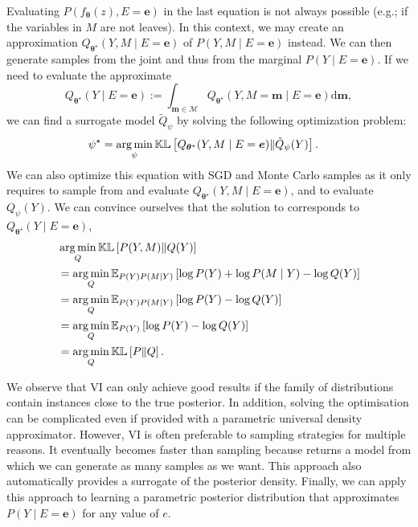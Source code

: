 Evaluating $P(f_{\bm{\theta}}(z), E=\bm{e})$ in the last equation is not always possible (e.g.; if the variables in $M$ are not leaves). In this context, we may create an approximation $Q_{\bm{\theta}^\star}(Y, M\mid E=\bm{e})$ of $P(Y, M\mid E=\bm{e})$ instead. We can then generate samples from the joint and thus from the marginal $P(Y\mid E=\bm{e})$. If we need to evaluate the approximate
$$Q_{\bm{\theta}^\star}(Y\mid E=\bm{e}) := \int_{\bm{m} \in \mathcal{M}} Q_{\bm{\theta}^\star}(Y, M=\bm{m}\mid E=\bm{e}) \text{d}\bm{m},$$ we can find a surrogate model $\tilde Q_\psi$ by solving the following optimization problem:
\begin{align}
  \psi^\star &= \operatorname*{arg\,min}_\psi \mathbb{KL}\left[Q_{\bm{\theta}^\star}(Y, M\mid E=\bm{e})\Vert \tilde Q_\psi(Y) \right]. \label{eq:approx_posterior}
\end{align}
We can also optimize this equation with SGD and Monte Carlo samples as it only requires to sample from and evaluate $Q_{\bm{\theta}^\star}(Y, M\mid E=\bm{e})$, and to evaluate $Q_\psi(Y)$. We can convince ourselves that the solution to  corresponds to $Q_{\bm{\theta}^\star}(Y\mid E=\bm{e})$,
\begin{align}
  &\operatorname*{arg\,min}_Q \mathbb{KL}\left[P(Y, M)\Vert Q(Y) \right]\\
  &=\operatorname*{arg\,min}_Q \mathbb{E}_{P(Y) P(M\mid Y)}\left[\log P(Y) + \log P(M\mid Y) - \log Q(Y)\right]\\
  &=\operatorname*{arg\,min}_Q \mathbb{E}_{P(Y) P(M\mid Y)}\left[\log P(Y) - \log Q(Y)\right]\\
  &= \operatorname*{arg\,min}_Q \mathbb{E}_{P(Y)}\left[\log P(Y) - \log Q(Y)\right]\\
  &= \operatorname*{arg\,min}_Q \mathbb{KL}\left[P\Vert Q \right].
\end{align}

We observe that VI can only achieve good results if the family of distributions contain instances close to the true posterior. In addition, solving the optimisation can be complicated even if provided with a parametric universal density approximator. However, VI is often preferable to sampling strategies for multiple reasons. It eventually becomes faster than sampling because  returns a model from which we can generate as many samples as we want. This approach also automatically provides a surrogate of the posterior density. Finally, we can apply this approach to learning a parametric posterior distribution that approximates $P(Y\mid E=\bm{e})$ for any value of $e$.

